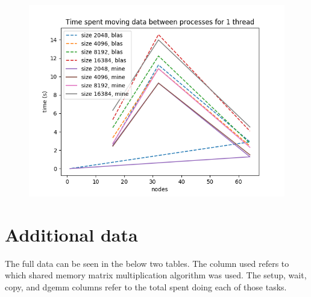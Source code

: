 \documentclass{article}
\begin{document}
\begin{figure}[h!]
    \centering
    \includegraphics[width=0.8\linewidth]{time_nodes_1_threads.png}
\end{figure}

\appendix

\section{Additional data}

The full data can be seen in the below two tables. The column used refers to which shared memory matrix
multiplication algorithm was used. The setup, wait, copy, and dgemm columns refer to the total spent doing
each of those tasks. 
\end{document}
